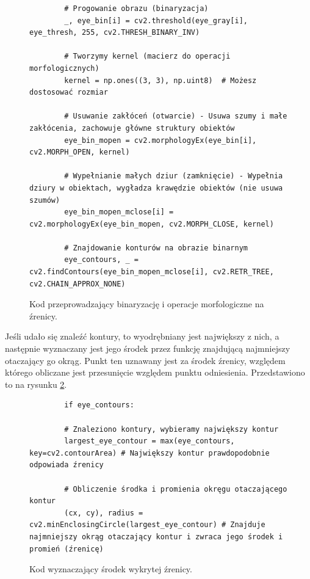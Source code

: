 \documentclass[a4paper,twoside,12pt]{book}
\begin{document}
\begin{figure}[htbp]
	\centering
	\begin{lstlisting}
		# Progowanie obrazu (binaryzacja)
		_, eye_bin[i] = cv2.threshold(eye_gray[i], eye_thresh, 255, cv2.THRESH_BINARY_INV)

		# Tworzymy kernel (macierz do operacji morfologicznych)
		kernel = np.ones((3, 3), np.uint8)  # Możesz dostosować rozmiar

		# Usuwanie zakłóceń (otwarcie) - Usuwa szumy i małe zakłócenia, zachowuje główne struktury obiektów
		eye_bin_mopen = cv2.morphologyEx(eye_bin[i], cv2.MORPH_OPEN, kernel)

		# Wypełnianie małych dziur (zamknięcie) - Wypełnia dziury w obiektach, wygładza krawędzie obiektów (nie usuwa szumów)
		eye_bin_mopen_mclose[i] = cv2.morphologyEx(eye_bin_mopen, cv2.MORPH_CLOSE, kernel)

		# Znajdowanie konturów na obrazie binarnym
		eye_contours, _ = cv2.findContours(eye_bin_mopen_mclose[i], cv2.RETR_TREE, cv2.CHAIN_APPROX_NONE)
	\end{lstlisting}
\caption{Kod przeprowadzający binaryzację i operacje morfologiczne na źrenicy.}
\label{fig:kod-binaryzacja}
\end{figure}

Jeśli udało się znaleźć kontury, to wyodrębniany jest największy z nich, a następnie wyznaczany jest jego środek przez funkcję znajdującą najmniejszy otaczający go okrąg. Punkt ten uznawany jest za środek źrenicy, względem którego obliczane jest przesunięcie względem punktu odniesienia. Przedstawiono to na rysunku \ref{fig:kod-zrenica}.

\begin{figure}[htbp]
	\centering
	\begin{lstlisting}
		if eye_contours:

		# Znaleziono kontury, wybieramy największy kontur
		largest_eye_contour = max(eye_contours, key=cv2.contourArea) # Największy kontur prawdopodobnie odpowiada źrenicy

		# Obliczenie środka i promienia okręgu otaczającego kontur
		(cx, cy), radius = cv2.minEnclosingCircle(largest_eye_contour) # Znajduje najmniejszy okrąg otaczający kontur i zwraca jego środek i promień (źrenicę)
	\end{lstlisting}
\caption{Kod wyznaczający środek wykrytej źrenicy.}
\label{fig:kod-zrenica}
\end{figure}
\end{document}
